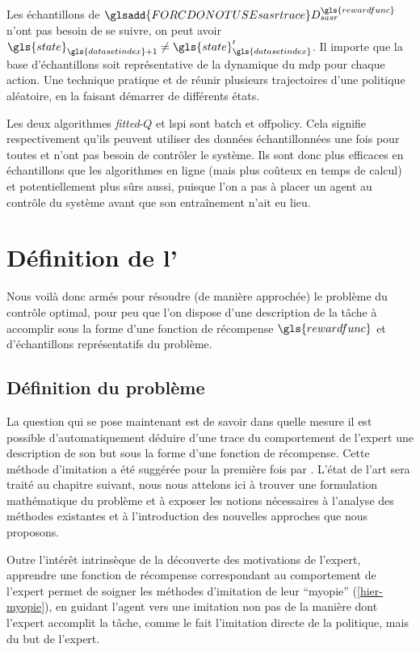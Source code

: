 \documentclass[frenchb,a4paper,justified,notoc]{tufte-book}
\newcommand{\rewardfunc}{\gls{rewardfunc}}
\newcommand{\datasetindex}{\gls{datasetindex}}
\newcommand{\state}{\gls{state}}
\newcommand{\sasrtrace}[1]{\ensuremath{\glsadd{FORCDONOTUSEsasrtrace}D_{sasr}^{#1}}}
\begin{document}
Les échantillons de $\sasrtrace{\rewardfunc}$ n'ont pas besoin de se suivre, on peut avoir $\state_{\datasetindex+1} \neq \state'_{\datasetindex}$. Il importe que la base d'échantillons soit représentative de la dynamique du \gls{mdp} pour chaque action. Une technique pratique et de réunir plusieurs trajectoires d'une politique aléatoire, en la faisant démarrer de différents états.

Les deux algorithmes \emph{fitted}-$Q$ et \gls{lspi} sont \gls{batch} et \gls{offpolicy}. Cela signifie respectivement qu'ils peuvent utiliser des données échantillonnées une fois pour toutes et n'ont pas besoin de contrôler le système. Ils sont donc plus efficaces en échantillons que les algorithmes en ligne (mais plus coûteux en temps de calcul) et potentiellement plus sûrs aussi, puisque l'on a pas à placer un agent au contrôle du système avant que son entraînement n'ait eu lieu.
\section{Définition de l'}
\label{sec-2-3}

Nous voilà donc armés pour résoudre (de manière approchée) le problème du contrôle optimal, pour peu que l'on dispose d'une description de la tâche à accomplir sous la forme d'une fonction de récompense $\rewardfunc$ et d'échantillons représentatifs du problème.
\subsection{Définition du problème}
\label{sec-2-3-1}
\label{hier-problemdef}


La question qui se pose maintenant est de savoir dans quelle mesure il est possible d'automatiquement déduire d'une trace du comportement de l'expert une description de son but sous la forme d'une fonction de récompense. Cette méthode d'imitation a été suggérée pour la première fois par \citet{russell1998learning}. L'état de l'art sera traité au chapitre suivant, nous nous attelons ici à trouver une formulation mathématique du problème et à exposer les notions nécessaires à l'analyse des méthodes existantes et à l'introduction des nouvelles approches que nous proposons.

Outre l'intérêt intrinsèque de la découverte des motivations de l'expert, apprendre une fonction de récompense correspondant au comportement de l'expert permet de soigner les méthodes d'imitation de leur ``myopie'' (\autoref{hier-myopie}), en guidant l'agent vers une imitation non pas de la manière dont l'expert accomplit la tâche, comme le fait l'imitation directe de la politique, mais du but de l'expert.
\end{document}

